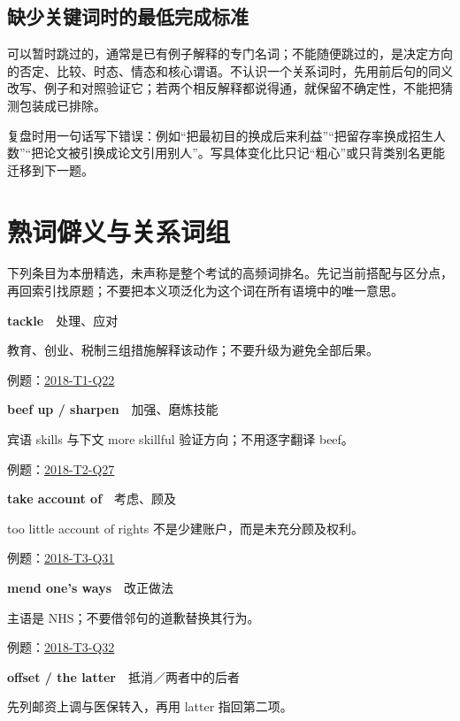\documentclass[11pt,a4paper]{article}
\begin{document}
\subsection{缺少关键词时的最低完成标准}
可以暂时跳过的，通常是已有例子解释的专门名词；不能随便跳过的，是决定方向的否定、比较、时态、情态和核心谓语。不认识一个关系词时，先用前后句的同义改写、例子和对照验证它；若两个相反解释都说得通，就保留不确定性，不能把猜测包装成已排除。

复盘时用一句话写下错误：例如“把最初目的换成后来利益”“把留存率换成招生人数”“把论文被引换成论文引用别人”。写具体变化比只记“粗心”或只背类别名更能迁移到下一题。

\clearpage\section{熟词僻义与关系词组}\label{vocabulary}
下列条目为本册精选，未声称是整个考试的高频词排名。先记当前搭配与区分点，再回索引找原题；不要把本义项泛化为这个词在所有语境中的唯一意思。

\noindent\textbf{tackle}　处理、应对\par\nopagebreak
教育、创业、税制三组措施解释该动作；不要升级为避免全部后果。

\noindent\small 例题：\hyperref[idx-2018-T1-Q22]{2018-T1-Q22}\normalsize\par\medskip
{}\noindent\textbf{beef up / sharpen}　加强、磨炼技能\par\nopagebreak
宾语 skills 与下文 more skillful 验证方向；不用逐字翻译 beef。

\noindent\small 例题：\hyperref[idx-2018-T2-Q27]{2018-T2-Q27}\normalsize\par\medskip
{}\noindent\textbf{take account of}　考虑、顾及\par\nopagebreak
too little account of rights 不是少建账户，而是未充分顾及权利。

\noindent\small 例题：\hyperref[idx-2018-T3-Q31]{2018-T3-Q31}\normalsize\par\medskip
{}\noindent\textbf{mend one’s ways}　改正做法\par\nopagebreak
主语是 NHS；不要借邻句的道歉替换其行为。

\noindent\small 例题：\hyperref[idx-2018-T3-Q32]{2018-T3-Q32}\normalsize\par\medskip
{}\noindent\textbf{offset / the latter}　抵消／两者中的后者\par\nopagebreak
先列邮资上调与医保转入，再用 latter 指回第二项。
\end{document}
